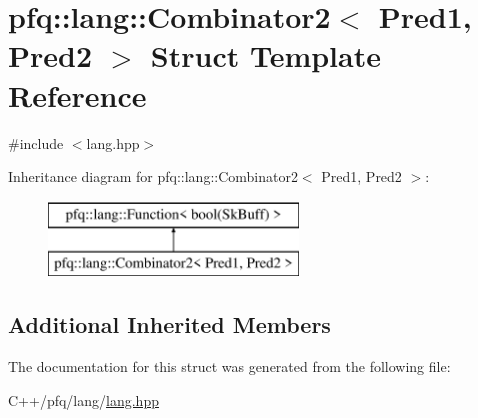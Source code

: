 \hypertarget{structpfq_1_1lang_1_1Combinator2}{\section{pfq\+:\+:lang\+:\+:Combinator2$<$ Pred1, Pred2 $>$ Struct Template Reference}
\label{structpfq_1_1lang_1_1Combinator2}
}


{\ttfamily \#include $<$lang.\+hpp$>$}

Inheritance diagram for pfq\+:\+:lang\+:\+:Combinator2$<$ Pred1, Pred2 $>$\+:\begin{figure}[H]
\begin{center}
\leavevmode
\includegraphics[height=2.000000cm]{structpfq_1_1lang_1_1Combinator2}
\end{center}
\end{figure}
\subsection*{Additional Inherited Members}


The documentation for this struct was generated from the following file\+:\begin{DoxyCompactItemize}
\item 
C++/pfq/lang/\hyperlink{lang_8hpp}{lang.\+hpp}\end{DoxyCompactItemize}
